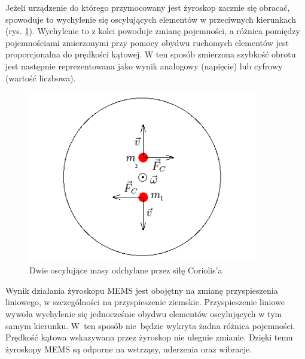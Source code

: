 Jeżeli urządzenie do którego przymocowany jest żyroskop zacznie się obracać,
spowoduje to wychylenie się oscylujących elementów w przeciwnych kierunkach
(rys. \ref{fig:ZyroCoriolis}). Wychylenie to z kolei powoduje zmianę pojemności, a
różnica pomiędzy pojemnościami zmierzonymi przy pomocy obydwu ruchomych
elementów jest proporcjonalna do prędkości kątowej. W ten sposób zmierzona
szybkość obrotu jest następnie reprezentowana jako wynik analogowy (napięcie)
lub cyfrowy (wartość liczbowa). \begin{figure}[!ht]
 \centering
 \includegraphics[height=75mm]{../images/ch04/gyro-coriolis.png}
 \caption{Dwie oscylujące masy odchylane przez siłę Coriolis'a}
 \label{fig:ZyroCoriolis}
\end{figure}

Wynik działania żyroskopu MEMS jest obojętny na zmianę przyspieszenia liniowego,
w szczególności na przyspieszenie ziemskie. Przyspieszenie liniowe wywoła
wychylenie się jednocześnie obydwu elementów oscylujących w tym samym kierunku. W~ten sposób nie~będzie wykryta żadna różnica pojemności. Prędkość kątowa
wskazywana przez żyroskop nie ulegnie zmianie. Dzięki temu żyroskopy MEMS są
odporne na wstrząsy, uderzenia oraz wibracje.

